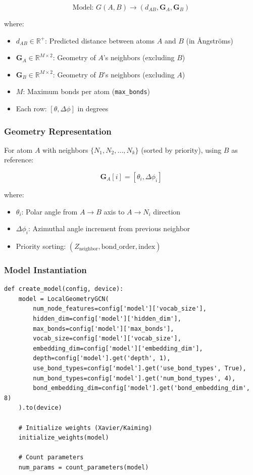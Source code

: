 \documentclass[11pt,a4paper]{article}
\begin{document}
\begin{equation}
\text{Model: } G(A, B) \rightarrow (d_{AB}, \mathbf{G}_A, \mathbf{G}_B)
\end{equation}

where:
\begin{itemize}
    \item $d_{AB} \in \mathbb{R}^+$: Predicted distance between atoms $A$ and $B$ (in Ångströms)
    \item $\mathbf{G}_A \in \mathbb{R}^{M \times 2}$: Geometry of $A$'s neighbors (excluding $B$)
    \item $\mathbf{G}_B \in \mathbb{R}^{M \times 2}$: Geometry of $B$'s neighbors (excluding $A$)
    \item $M$: Maximum bonds per atom (\texttt{max\_bonds})
    \item Each row: $[\theta, \Delta\phi]$ in degrees
\end{itemize}

\subsubsection{Geometry Representation}

For atom $A$ with neighbors $\{N_1, N_2, \ldots, N_k\}$ (sorted by priority), using $B$ as reference:

\begin{equation}
\mathbf{G}_A[i] = [\theta_i, \Delta\phi_i]
\end{equation}

where:
\begin{itemize}
    \item $\theta_i$: Polar angle from $A \rightarrow B$ axis to $A \rightarrow N_i$ direction
    \item $\Delta\phi_i$: Azimuthal angle increment from previous neighbor
    \item Priority sorting: $(Z_{\text{neighbor}}, \text{bond\_order}, \text{index})$
\end{itemize}

\subsubsection{Model Instantiation}

\begin{lstlisting}[caption={Model Creation (lines 209-255)}]
def create_model(config, device):
    model = LocalGeometryGCN(
        num_node_features=config['model']['vocab_size'],
        hidden_dim=config['model']['hidden_dim'],
        max_bonds=config['model']['max_bonds'],
        vocab_size=config['model']['vocab_size'],
        embedding_dim=config['model']['embedding_dim'],
        depth=config['model'].get('depth', 1),
        use_bond_types=config['model'].get('use_bond_types', True),
        num_bond_types=config['model'].get('num_bond_types', 4),
        bond_embedding_dim=config['model'].get('bond_embedding_dim', 8)
    ).to(device)

    # Initialize weights (Xavier/Kaiming)
    initialize_weights(model)

    # Count parameters
    num_params = count_parameters(model)
\end{lstlisting}
\end{document}

